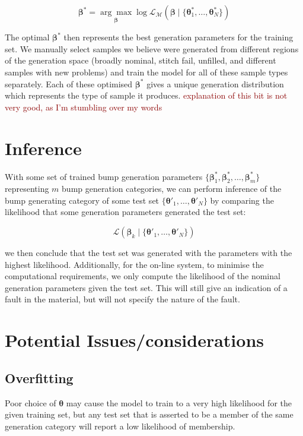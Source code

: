 \documentclass[12pt]{report}
\newcommand{\tcr}[1]{\textcolor{darkRed}{#1}}
\begin{document}
        \[
            \pmb{\beta}^* = \underset{\pmb{\beta}}{\arg\max}\log\mathcal{L}_\mathcal{M}(\pmb{\beta}\mid \{\pmb{\theta}^*_1,\ldots,\pmb{\theta}^*_N\})
        \]
        
        The optimal $\pmb{\beta}^*$ then represents the best generation parameters for the training set. We manually select samples we believe were generated from different regions of the generation space (broadly nominal, stitch fail, unfilled, and different samples with new problems) and train the model for all of these sample types separately. Each of these optimised $\pmb{\beta}^*$ gives a unique generation distribution which represents the type of sample it produces. 
        \tcr{explanation of this bit is not very good, as I'm stumbling over my words}
    
    \section{Inference}
        With some set of trained bump generation parameters $\{\pmb{\beta}^*_1,\pmb{\beta}^*_2,\ldots,\pmb{\beta}^*_m\}$ representing $m$ bump generation categories, we can perform inference of the bump generating category of some test set $\{\pmb{\theta}'_1,\ldots,\pmb{\theta}'_N\}$ by comparing the likelihood that some generation parameters generated the test set:
        
        \[ 
            \mathcal{L}(\pmb{\beta}_k \mid \{\pmb{\theta}'_1,\ldots,\pmb{\theta}'_N\})
        \]
        
        we then conclude that the test set was generated with the parameters with the highest likelihood. Additionally, for the on-line system, to minimise the computational requirements, we only compute the likelihood of the nominal generation parameters given the test set. This will still give an indication of a fault in the material, but will not specify the nature of the fault.
        
    \section{Potential Issues/considerations}
        \subsection{Overfitting}
            Poor choice of $\pmb{\theta}$ may cause the model to train to a very high likelihood for the given training set, but any test set that is asserted to be a member of the same generation category will report a low likelihood of membership. 
\end{document}
